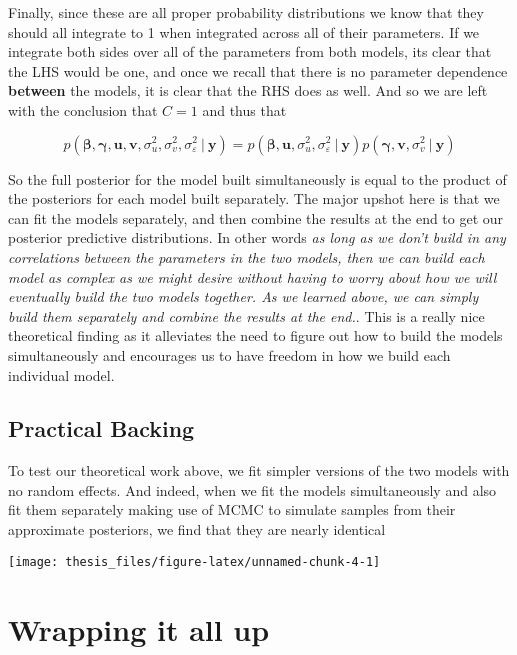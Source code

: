 \documentclass[12pt,twoside]{reedthesis}
\begin{document}
Finally, since these are all proper probability distributions we know that they should all integrate to 1 when integrated across all of their parameters. If we integrate both sides over all of the parameters from both models, its clear that the LHS would be one, and once we recall that there is no parameter dependence \textbf{between} the models, it is clear that the RHS does as well. And so we are left with the conclusion that \(C = 1\) and thus that

\[
p(\boldsymbol{\beta}, \boldsymbol{\gamma}, \mathbf{u}, \mathbf{v}, \sigma_u^2, \sigma_v^2, \sigma_{\varepsilon}^2\ | \ \mathbf{y})  = p(\boldsymbol{\beta}, \mathbf{u}, \sigma_u^2, \sigma_{\varepsilon}^2 \ | \ \mathbf{y})p(\boldsymbol{\gamma}, \mathbf{v}, \sigma_v^2 \ | \ \mathbf{y}) 
\]

So the full posterior for the model built simultaneously is equal to the product of the posteriors for each model built separately. The major upshot here is that we can fit the models separately, and then combine the results at the end to get our posterior predictive distributions. In other words \emph{as long as we don't build in any correlations between the parameters in the two models, then we can build each model as complex as we might desire without having to worry about how we will eventually build the two models together. As we learned above, we can simply build them separately and combine the results at the end.}. This is a really nice theoretical finding as it alleviates the need to figure out how to build the models simultaneously and encourages us to have freedom in how we build each individual model.

\hypertarget{practical-backing}{%
\subsection{Practical Backing}\label{practical-backing}}

To test our theoretical work above, we fit simpler versions of the two models with no random effects. And indeed, when we fit the models simultaneously and also fit them separately making use of MCMC to simulate samples from their approximate posteriors, we find that they are nearly identical
\begin{center}\texttt{[image: thesis\_files/figure-latex/unnamed-chunk-4-1]} \end{center}

\hypertarget{wrapping-it-all-up}{%
\section{Wrapping it all up}\label{wrapping-it-all-up}}
\end{document}
